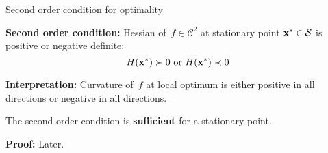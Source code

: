 \documentclass[11pt,compress,t,notes=noshow, xcolor=table]{beamer}
\begin{document}
\begin{vbframe}{Second order condition for optimality}

\vspace{-0.5\baselineskip}


\textbf{Second order condition:}
Hessian of~$f \in \mathcal{C}^2$ at stationary point $\mathbf{x}^\ast \in \mathcal{S}$ is positive or negative definite:
\vspace{-0.5\baselineskip}
\begin{equation*}
    H(\mathbf{x}^\ast) \succ 0 \text{ or } H(\mathbf{x}^\ast) \prec 0
\end{equation*}


\textbf{Interpretation:} Curvature of~$f$ at local optimum is either positive in all directions or negative in all directions.

\vspace{0.5\baselineskip}

The second order condition is \textbf{sufficient} for a stationary point.

\begin{footnotesize}
    \textbf{Proof:} Later.
\end{footnotesize}






\end{vbframe}
\end{document}
